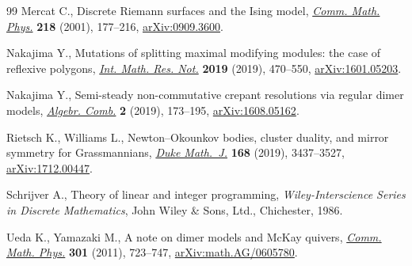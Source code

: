 \documentclass[pdftex]{sigma}%
\numberwithin{equation}{section}
\numberwithin{figure}{section}
\numberwithin{table}{section}
\begin{document}
\begin{thebibliography}{99}
Mercat C., Discrete {R}iemann surfaces and the {I}sing model, \href{https://doi.org/10.1007/s002200000348}{\textit{Comm.
 Math. Phys.}} \textbf{218} (2001), 177--216, \href{https://arxiv.org/abs/0909.3600}{arXiv:0909.3600}.

Nakajima Y., Mutations of splitting maximal modifying modules: the case of
 reflexive polygons, \href{https://doi.org/10.1093/imrn/rnx114}{\textit{Int. Math. Res. Not.}} \textbf{2019} (2019),
 470--550, \href{https://arxiv.org/abs/1601.05203}{arXiv:1601.05203}.

Nakajima Y., Semi-steady non-commutative crepant resolutions via regular dimer
 models, \href{https://doi.org/10.5802/alco.39}{\textit{Algebr. Comb.}} \textbf{2} (2019), 173--195,
 \href{https://arxiv.org/abs/1608.05162}{arXiv:1608.05162}.

Rietsch K., Williams L., Newton--{O}kounkov bodies, cluster duality, and mirror
 symmetry for {G}rassmannians, \href{https://doi.org/10.1215/00127094-2019-0028}{\textit{Duke Math.~J.}} \textbf{168} (2019),
 3437--3527, \href{https://arxiv.org/abs/1712.00447}{arXiv:1712.00447}.

Schrijver A., Theory of linear and integer programming, \textit{Wiley-Interscience
 Series in Discrete Mathematics}, John Wiley \& Sons, Ltd., Chichester, 1986.

Ueda K., Yamazaki M., A note on dimer models and {M}c{K}ay quivers,
 \href{https://doi.org/10.1007/s00220-010-1101-0}{\textit{Comm. Math. Phys.}} \textbf{301} (2011), 723--747,
 \href{https://arxiv.org/abs/math.AG/0605780}{arXiv:math.AG/0605780}.

\end{thebibliography}\LastPageEnding
\end{document}
